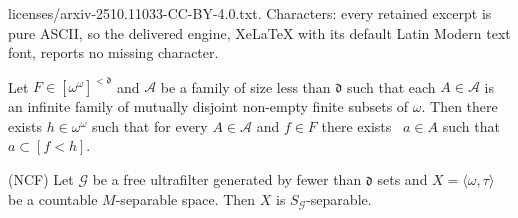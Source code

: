 \documentclass[10pt,a4paper]{amsart}
\newcommand{\CG}{\mathcal{G}}
\newcommand{\hot}{\mathfrak}
\newcommand{\la}{\langle}
\newcommand{\ra}{\rangle}
\newcommand{\w}{\omega}
\begin{document}
licenses/arxiv-2510.11033-CC-BY-4.0.txt. Characters: every retained excerpt is pure ASCII, so the delivered engine, XeLaTeX with its default Latin Modern text font, reports no missing character.
\begin{lemma} \label{less_d}
Let $F\in [\w^\w]^{<\hot d}$ and 
$\mathcal A$ be a family of size less than $\hot d$
such that each $A\in\mathcal A$ is an infinite family of mutually disjoint 
non-empty finite subsets of $\w$. Then there exists 
$h\in\w^\w$ such that 
for every $A\in \mathcal A$ and $f\in F$ there exists \
$a\in A$ such that $a\subset [f<h]$.
\end{lemma}

\begin{proposition}\label{ncf_s_sep}
(NCF) Let $\CG$ be {a free} ultrafilter generated by fewer than  $\hot d$ sets and
$X=\la\w,\tau\ra$ be a countable $M$-separable space. Then $X$ is $S_{\CG}$-separable. 
\end{proposition}
\end{document}
